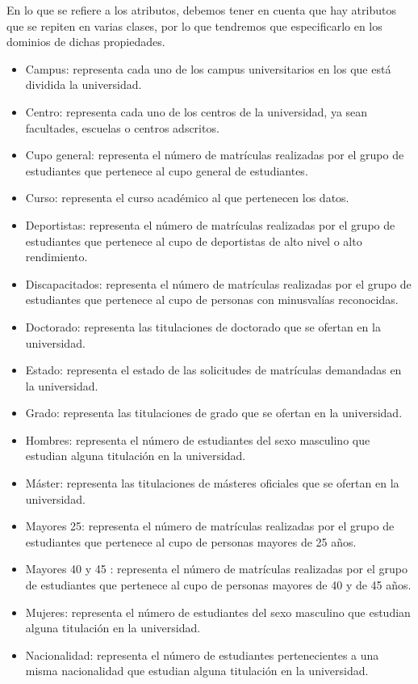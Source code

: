 En lo que se refiere a los atributos, debemos tener en cuenta que hay atributos que se repiten en varias clases, por lo que tendremos que especificarlo en los dominios de dichas propiedades.

\begin{itemize}
		\item Campus: representa cada uno de los campus universitarios en los que está dividida la universidad.
		\item Centro: representa cada uno de los centros de la universidad, ya sean facultades, escuelas o centros adscritos.
		\item Cupo general: representa el número de matrículas realizadas por el grupo de estudiantes que pertenece al cupo general de estudiantes.
		\item Curso: representa el curso académico al que pertenecen los datos.
		\item Deportistas: representa el número de matrículas realizadas por el grupo de estudiantes que pertenece al cupo de deportistas de alto nivel o alto rendimiento.
		\item Discapacitados: representa el número de matrículas realizadas por el grupo de estudiantes que pertenece al cupo de personas con minusvalías reconocidas.
		\item Doctorado: representa las titulaciones de doctorado que se ofertan en la universidad.
		\item Estado: representa el estado de las solicitudes de matrículas demandadas en la universidad.
		\item Grado: representa las titulaciones de grado que se ofertan en la universidad.
		\item Hombres: representa el número de estudiantes del sexo masculino que estudian alguna titulación en la universidad.
		\item Máster: representa las titulaciones de másteres oficiales que se ofertan en la universidad.
		\item Mayores 25: representa el número de matrículas realizadas por el grupo de estudiantes que pertenece al cupo de personas mayores de 25 años.
		\item Mayores 40 y 45 : representa el número de matrículas realizadas por el grupo de estudiantes que pertenece al cupo de personas mayores de 40 y de 45 años.
		\item Mujeres: representa el número de estudiantes del sexo masculino que estudian alguna titulación en la universidad.
		\item Nacionalidad: representa el número de estudiantes pertenecientes a una misma nacionalidad que estudian alguna titulación en la universidad.

\end{itemize}
